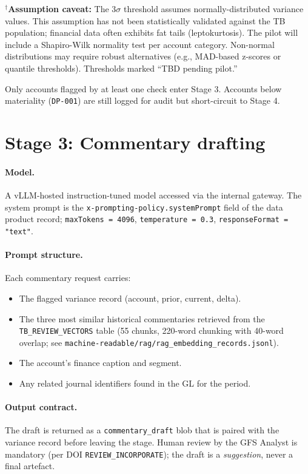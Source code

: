 \noindent$^{\dagger}$\textbf{Assumption caveat:} The $3\sigma$ threshold assumes
normally-distributed variance values. This assumption has not been statistically
validated against the TB population; financial data often exhibits fat tails
(leptokurtosis). The pilot will include a Shapiro-Wilk normality test per account
category. Non-normal distributions may require robust alternatives (e.g., MAD-based
z-scores or quantile thresholds). Thresholds marked ``TBD pending pilot.''

Only accounts flagged by at least one check enter Stage 3. Accounts
below materiality (\texttt{DP-001}) are still logged for audit but
short-circuit to Stage 4.

\section{Stage 3: Commentary drafting}

\paragraph{Model.} A vLLM-hosted instruction-tuned model accessed
via the internal gateway. The system prompt is the
\texttt{x-prompting-policy.systemPrompt} field of the data product
record; \texttt{maxTokens = 4096}, \texttt{temperature = 0.3},
\texttt{responseFormat = "text"}.

\paragraph{Prompt structure.} Each commentary request carries:
\begin{itemize}
  \item The flagged variance record (account, prior, current, delta).
  \item The three most similar historical commentaries retrieved from
        the \texttt{TB\_REVIEW\_VECTORS} table (55 chunks, 220-word
        chunking with 40-word overlap; see
        \corpus\texttt{machine-readable/rag/rag\_embedding\_records.jsonl}).
  \item The account's finance caption and segment.
  \item Any related journal identifiers found in the GL for the period.
\end{itemize}

\paragraph{Output contract.} The draft is returned as a
\texttt{commentary\_draft} blob that is paired with the variance
record before leaving the stage. Human review by the GFS Analyst is
mandatory (per DOI \texttt{REVIEW\_INCORPORATE}); the draft is a
\emph{suggestion}, never a final artefact.

